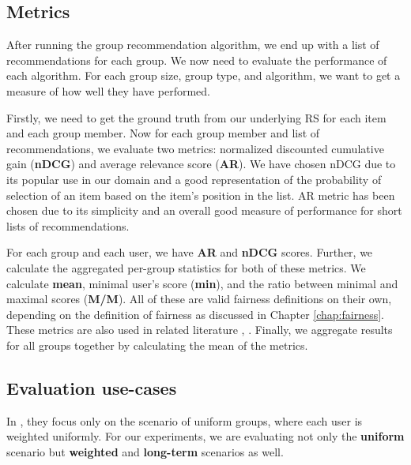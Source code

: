 \subsection{Metrics}\label{subsec:07_experiments.evaluation.metrics}

After running the group recommendation algorithm, we end up with a list of recommendations for each group. We now need to evaluate the performance of each algorithm.
For each group size, group type, and algorithm, we want to get a measure of how well they have performed.

Firstly, we need to get the ground truth from our underlying RS for each item and each group member.
Now for each group member and list of recommendations, we evaluate two metrics: normalized discounted cumulative gain (\textbf{nDCG}) and average relevance score (\textbf{AR}). We have chosen nDCG due to its popular use in our domain and a good representation of the probability of selection of an item based on the item's position in the list. AR metric has been chosen due to its simplicity and an overall good measure of performance for short lists of recommendations.

For each group and each user, we have \textbf{AR} and \textbf{nDCG} scores. Further, we calculate the aggregated per-group statistics for both of these metrics. We calculate \textbf{mean}, minimal user's score (\textbf{min}), and the ratio between minimal and maximal scores (\textbf{M/M}). All of these are valid fairness definitions on their own, depending on the definition of fairness as discussed in Chapter \ref{chap:fairness}. These metrics are also used in related literature \cite{GFAR-kaya2020}, \cite{sacharidis_2019_top_n_with_fairness}. Finally, we aggregate results for all groups together by calculating the mean of the metrics.

\subsection{Evaluation use-cases}\label{subsec:07_experiments.evaluation.use_cases}

In \cite{GFAR-kaya2020}, they focus only on the scenario of uniform groups, where each user is weighted uniformly. For our experiments, we are evaluating not only the \textbf{uniform} scenario but \textbf{weighted} and \textbf{long-term} scenarios as well.

